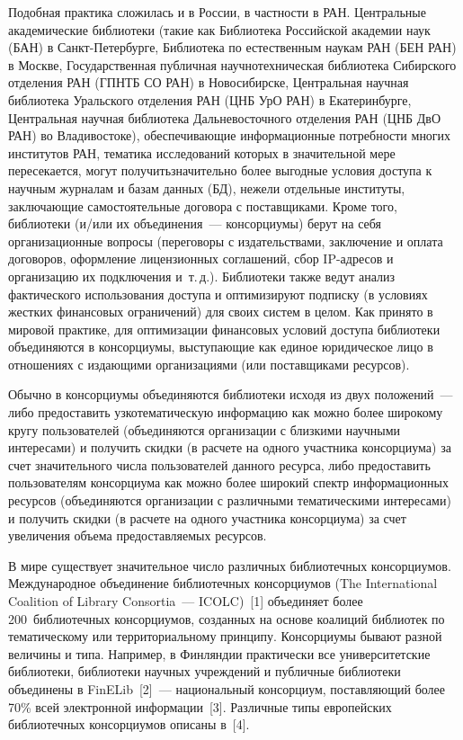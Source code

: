 \begin{multicols}{2}
     Подобная практика сложилась и в России, в частности в РАН. 
Центральные академические биб\-лио\-те\-ки (такие как Библиотека Российской 
академии наук (БАН) в Санкт-Пе\-тер\-бур\-ге, Биб\-лио\-те\-ка по естественным наукам 
РАН (БЕН РАН) в Москве, Государственная публичная научнотехническая биб\-лио\-те\-ка Сибирского 
отделения РАН (\mbox{ГПНТБ} СО РАН)
 в Новосибирске, Центральная научная биб\-лио\-те\-ка 
Уральского отделения РАН (ЦНБ УрО РАН) в Екатеринбурге, Центральная научная 
биб\-лио\-тека Дальневос\-точ\-ного отделения РАН (ЦНБ ДвО РАН) во Вла\-ди\-востоке), 
обеспечивающие информационные потребности многих институтов РАН, 
тематика исследований которых в значительной мере пересекается, могут 
получить\linebreak значительно более выгодные условия доступа к \mbox{научным} журналам 
и базам данных (БД), нежели отдельные институты, заключающие 
самостоятельные договора с поставщиками. Кроме того, биб\-лио\-те\-ки (и/или 
их объединения~--- консорциумы) берут на себя организационные вопросы 
(переговоры с издательствами, заключение и оплата договоров, оформление 
лицензионных соглашений, сбор IP-адресов и организацию их подключения 
и~т.\,д.). Библиотеки также ведут анализ фактического использования 
доступа и оптимизируют подписку (в условиях жестких финансовых 
ограничений) для своих систем в целом.
     Как принято в мировой практике, для оптимизации финансовых 
условий доступа биб\-лио\-те\-ки объединяются в консорциумы, выступающие 
как единое юридическое лицо в отношениях с из\-да\-ющи\-ми организациями 
(или поставщиками ресурсов).
     
     Обычно в консорциумы объединяются биб\-лио\-те\-ки исходя из двух 
положений~--- либо предоставить узкотематическую информацию как можно 
более широкому кругу пользователей (объединяются организации с 
близкими научными интересами) и получить скидки (в расчете на одного 
участника консорциума) за счет значительного числа пользователей данного 
ресурса, либо предоставить пользователям консорциума как можно более 
широкий спектр информационных ресурсов (объединяются организации с 
различными тематическими интересами) и получить скидки (в расчете на 
одного участника консорциума) за счет увеличения объема предоставляемых 
ресурсов.
     
     В мире существует значительное число различных биб\-лио\-теч\-ных 
консорциумов. Международное объединение биб\-лио\-теч\-ных консорциумов 
(The International Coalition of Library Consortia~--- ICOLC)~[1] объединяет 
более 200~биб\-лио\-теч\-ных консорциумов, созданных на основе коалиций 
биб\-лио\-тек по тематическому или территориальному принципу. 
Консорциумы бывают разной величины и типа. Например, в Финляндии 
практически все университетские биб\-лио\-те\-ки, биб\-лио\-те\-ки научных 
учреждений и пуб\-лич\-ные биб\-лио\-те\-ки объединены в FinELib~[2]~--- 
национальный консорциум, по\-став\-ля\-ющий более 70\% всей электронной 
информации~[3]. Различные типы европейских биб\-лио\-теч\-ных консорциумов 
описаны в~[4].


\end{multicols}
